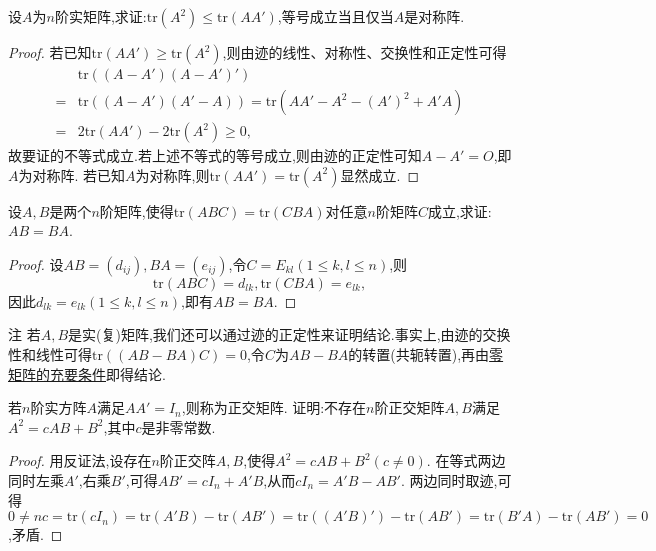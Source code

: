 \documentclass[../../main.tex]{subfiles}
\begin{document}
\begin{proposition}\label{proposition:矩阵迹的不等式}
设\(A\)为\(n\)阶实矩阵,求证:\(\mathrm{tr}(A^2)\leq\mathrm{tr}(AA')\),等号成立当且仅当\(A\)是对称阵.
\end{proposition}
\begin{proof}
若已知$\mathrm{tr}(AA') \geq \mathrm{tr}(A^2)$,则由迹的线性、对称性、交换性和正定性可得
\begin{align*}
&\mathrm{tr}((A - A')(A - A')')\\
=&\mathrm{tr}((A - A')(A' - A))=\mathrm{tr}(AA' - A^2 - (A')^2 + A'A)\\
=&2\mathrm{tr}(AA') - 2\mathrm{tr}(A^2)\geq0,
\end{align*}
故要证的不等式成立.若上述不等式的等号成立,则由迹的正定性可知\(A - A' = O\),即\(A\)为对称阵.
若已知$A$为对称阵,则$\mathrm{tr}(AA') = \mathrm{tr}(A^2)$显然成立.
\end{proof}

\begin{proposition}\label{proposition:矩阵可交换关于迹的充分条件}
设\(A,B\)是两个\(n\)阶矩阵,使得\(\mathrm{tr}(ABC)=\mathrm{tr}(CBA)\)对任意\(n\)阶矩阵\(C\)成立,求证:\(AB = BA\).
\end{proposition}
\begin{proof}
设\(AB=(d_{ij}),BA=(e_{ij})\),令\(C = E_{kl}(1\leq k,l\leq n)\),则
\[
\mathrm{tr}(ABC)=d_{lk},\mathrm{tr}(CBA)=e_{lk},
\]
因此\(d_{lk}=e_{lk}(1\leq k,l\leq n)\),即有\(AB = BA\).
\end{proof}
\begin{remark}
注 若\(A,B\)是实(复)矩阵,我们还可以通过迹的正定性来证明结论.事实上,由迹的交换性和线性可得\(\mathrm{tr}((AB - BA)C)=0\),令\(C\)为\(AB - BA\)的转置(共轭转置),再由\hyperref[proposition:零矩阵的充要条件]{零矩阵的充要条件}即得结论.
\end{remark}

\begin{example}
若\(n\)阶实方阵\(A\)满足\(AA' = I_n\),则称为正交矩阵. 证明:不存在\(n\)阶正交矩阵\(A,B\)满足\(A^2 = cAB + B^2\),其中\(c\)是非零常数.
\end{example}
\begin{proof}
用反证法,设存在\(n\)阶正交阵\(A,B\),使得\(A^2 = cAB + B^2(c\neq0)\). 在等式两边同时左乘\(A'\),右乘\(B'\),可得\(AB' = cI_n + A'B\),从而\(cI_n = A'B - AB'\). 两边同时取迹,可得\(0\ne nc=\text{tr}(cI_n)=\text{tr}(A'B)-\text{tr}(AB')=\text{tr}((A'B)') - \text{tr}(AB')=\text{tr}(B'A)-\text{tr}(AB') = 0\),矛盾.
\end{proof}
\end{document}

